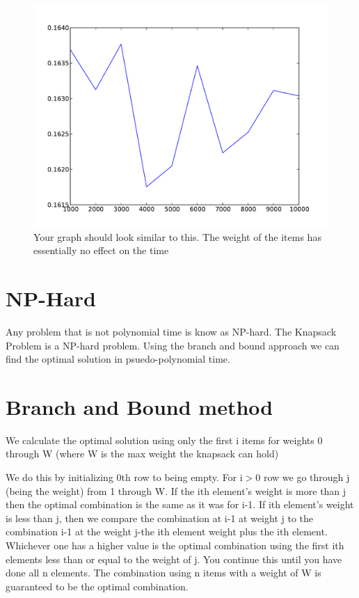 \begin{figure}[H]
\includegraphics[scale = .5]{naiveWeight.pdf}
\caption{Your graph should look similar to this. The weight of the items has essentially no effect on the time}
\end{figure}

\section*{NP-Hard}

Any problem that is not polynomial time is know as NP-hard. The Knapsack Problem is a NP-hard problem. Using the branch and bound approach we can find the optimal solution in psuedo-polynomial time.

\section*{Branch and Bound method}
We calculate the optimal solution using only the first i items for weights 0 through W (where W is the max weight the knapsack can hold)

We do this by initializing 0th row to being empty.
For i$>$0 row we go through j (being the weight) from 1 through W. If the ith element's weight is more than j then the optimal combination is the same as it was for i-1. If ith element's weight is less than j, then we compare the combination at i-1 at weight j to the combination i-1 at the weight j-the ith element weight plus the ith element. Whichever one has a higher value is the optimal combination using the first ith elements less than or equal to the weight of j. You continue this until you have done all n elements. The combination using n items with a weight of W is guaranteed to be the optimal combination.

